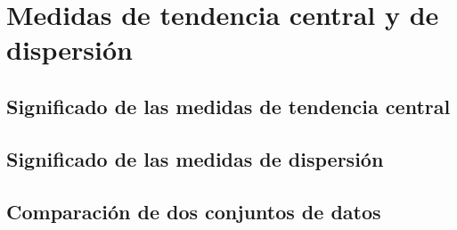 \thispagestyle{plain}
\section{Medidas de tendencia central y de dispersión}
\subsection{Significado de las medidas de tendencia central}
\subsection{Significado de las medidas de dispersión}
\subsection{Comparación de dos conjuntos de datos}

\newpage